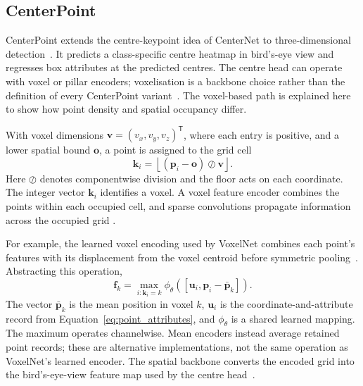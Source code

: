 \subsection{CenterPoint}
\label{subsec:centerpoint}

CenterPoint extends the centre-keypoint idea of CenterNet to
three-dimensional detection~\cite{yin2021centerpoint,zhou2019objectsaspoints}.
It predicts a class-specific centre heatmap in bird's-eye view and regresses
box attributes at the predicted centres. The centre head can operate with
voxel or pillar encoders; voxelisation is a backbone choice rather than
the definition of every CenterPoint variant~\cite{yin2021centerpoint}.
The voxel-based path is explained here to show how point density and spatial
occupancy differ.

With voxel dimensions $\mathbf v=(v_x,v_y,v_z)^{\mathsf T}$, where each
entry is positive, and a lower spatial bound $\mathbf o$, a point is
assigned to the grid cell
\begin{equation}
 \mathbf k_i=\left\lfloor(\mathbf p_i-\mathbf o)\oslash\mathbf v\right\rfloor.
 \label{eq:voxel_index}
\end{equation}
Here $\oslash$ denotes componentwise division and the floor acts on each
coordinate. The integer vector $\mathbf k_i$ identifies a voxel. A voxel
feature encoder combines the points within each occupied cell, and sparse
convolutions propagate information across the occupied grid
\cite{zhou2018voxelnet,yan2018second}.

For example, the learned voxel encoding used by VoxelNet combines each
point's features with its displacement from the voxel centroid before
symmetric pooling~\cite{zhou2018voxelnet}. Abstracting this operation,
\begin{equation}
 \mathbf f_k=\max_{i:\mathbf k_i=k}
 \phi_\theta([\mathbf u_i,\mathbf p_i-\bar{\mathbf p}_k]).
 \label{eq:vfe_general}
\end{equation}
The vector $\bar{\mathbf p}_k$ is the mean position in voxel $k$,
$\mathbf u_i$ is the coordinate-and-attribute record from
Equation~\eqref{eq:point_attributes}, and $\phi_\theta$ is a shared learned
mapping. The maximum operates channelwise. Mean encoders instead average
retained point records; these are alternative implementations, not the
same operation as VoxelNet's learned encoder. The spatial backbone converts
the encoded grid into the bird's-eye-view feature map used by the centre
head~\cite{yin2021centerpoint}.

